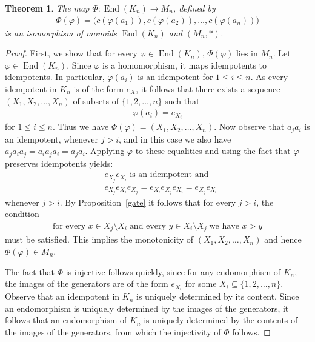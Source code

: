 \documentclass[pdflatex,sn-mathphys-num]{sn-jnl}%
\theoremstyle{thmstyleone}%
\newtheorem{theorem}{Theorem}%
\theoremstyle{thmstyletwo}%
\theoremstyle{thmstylethree}%
\begin{document}
\begin{theorem}\label{thm:Phi}
   The map $\Phi : \operatorname{End}(K_n) \rightarrow M_n$, defined by
   \begin{align*}
      \Phi(\varphi) = \big( c(\varphi(a_1)), c(\varphi(a_2)), \dots, c(\varphi(a_n)) \big)
   \end{align*}
   is an isomorphism of monoids $\operatorname{End}(K_n)$ and $(M_n, \ast)$.
\end{theorem}



\begin{proof}
   First, we show that for every $\varphi \in \operatorname{End}(K_n)$, $\Phi(\varphi)$ lies in $M_n$. Let $\varphi \in \operatorname{End}(K_n)$. 
   Since $\varphi$ is a homomorphism, it maps idempotents to idempotents. In particular, $\varphi(a_i)$ is an idempotent for 
   $1 \leq i \leq n$. As every idempotent in $K_n$ is of the form $e_X$, it follows that there exists a sequence $(X_1, X_2, \dots, X_n)$ of subsets of $\{1, 2, \dots, n\}$ such that
   \begin{align*}
      \varphi(a_i) = e_{X_i}
   \end{align*}
   for $1 \leq i \leq n$. Thus we have $\Phi(\varphi) = (X_1, X_2, \dots, X_n)$. Now observe that $a_j a_i$ is an idempotent, whenever $j > i$, and in this case we also have $a_ja_ia_j = a_i a_j a_i = a_j a_i$. Applying $\varphi$ to these equalities and using the fact that $\varphi$ preserves idempotents yields:
   \begin{align*}
      & e_{X_j} e_{X_i} \text{ is an idempotent and} \\
      & e_{X_j} e_{X_i} e_{X_j} = e_{X_i} e_{X_j} e_{X_i} = e_{X_j} e_{X_i}
   \end{align*}
   whenever $j > i$. By Proposition~\ref{gate} it follows that for every $j>i$, the condition 
   \begin{align*}
      \text{for every } x \in X_j \setminus X_i\; \text{and every } y \in X_i \setminus X_j\; \text{we have } x > y
   \end{align*}
   must be satisfied. This implies the monotonicity of $(X_1, X_2, \dots, X_n)$ and hence $\Phi(\varphi) \in M_n$. 





   The fact that $\Phi$ is injective follows quickly, since for any endomorphism of $K_n$, the images of the generators are of the form $e_{X_i}$ for some $X_i \subseteq \{1, 2, \dots, n\}$.
   Observe that an idempotent in $K_n$ is uniquely determined by its content. Since an endomorphism is uniquely determined by the images of the generators, it follows that an endomorphism of $K_n$ is uniquely determined by the contents of the images of the generators, from which the injectivity of $\Phi$ follows.



\end{proof}
\end{document}
